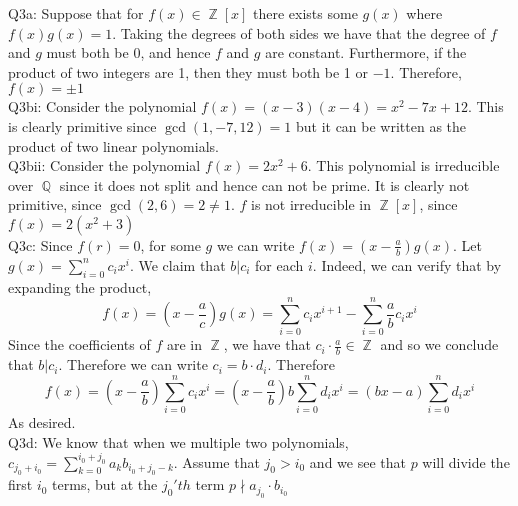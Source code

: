 \documentclass[letterpaper]{article}
\DeclareMathOperator{\Z}{\mathbb{Z}}
\DeclareMathOperator{\Q}{\mathbb{Q}}
\begin{document}
\noindent Q3a: Suppose that for $f(x)\in \Z[x]$ there exists some $g(x)$ where $f(x)g(x)=1$. Taking the degrees of both sides we have that the degree of $f$ and $g$ must both be 0, and hence $f$ and $g$ are constant. Furthermore, if the product of two integers are 1, then they must both be 1 or $-1$. Therefore, $f(x)= \pm 1$
\newline \\ Q3bi: Consider the polynomial $f(x) = (x-3)(x-4) = x^2-7x+12$. This is clearly primitive since $\gcd(1,-7,12)=1$ but it can be written as the product of two linear polynomials.
\newline \\ Q3bii: Consider the polynomial $f(x)= 2x^2+6$. This polynomial is irreducible over $\Q$ since it does not split and hence can not be prime. It is clearly not primitive, since $\gcd(2,6)= 2\neq 1$. $f$ is not irreducible in $\Z[x]$, since $f(x)= 2(x^2+3)$
\newline \\ Q3c: Since $f(r)=0$, for some $g$ we can write $f(x)=(x-\frac{a}{b})g(x)$. Let $g(x) = \sum_{i=0}^n c_i x^i$. We claim that $b|c_i$ for each $i$. Indeed, we can verify that by expanding the product, $$f(x)=(x-\frac{a}{c})g(x) = \sum_{i=0}^n c_i x^{i+1} - \sum_{i=0}^n \frac{a}{b}c_ix^i$$
Since the coefficients of $f$ are in $\Z$, we have that $c_i\cdot \frac{a}{b}\in \Z$ and so we conclude that $b|c_i$. Therefore we can write $c_i = b\cdot d_i$. Therefore 
$$f(x) = (x-\frac{a}{b})\sum_{i=0}^n c_i x^i = (x-\frac{a}{b})b \sum_{i=0}^n d_i x^i = (bx-a)\sum_{i=0}^n d_ix^i$$
As desired. 
\newline \\ Q3d: We know that when we multiple two polynomials, $c_{j_0+i_0} = \sum_{k=0}^{i_0+j_0} a_{k}b_{i_0+j_0-k} $. Assume that $j_0>i_0$ and we see that $p$ will divide the first $i_0$ terms, but at the $j_0'th$ term $p \nmid a_{j_0}\cdot b_{i_0}$
\end{document}
